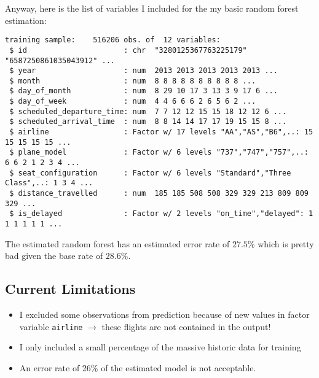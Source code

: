 \documentclass{article}\usepackage[]{graphicx}\usepackage[]{color}
\makeatletter
\newenvironment{kframe}{%
 \def\at@end@of@kframe{}%
 \ifinner\ifhmode%
  \def\at@end@of@kframe{\end{minipage}}%
  \begin{minipage}{\columnwidth}%
 \fi\fi%
 \def\FrameCommand##1{\hskip\@totalleftmargin \hskip-\fboxsep
 \colorbox{shadecolor}{##1}\hskip-\fboxsep
     \hskip-\linewidth \hskip-\@totalleftmargin \hskip\columnwidth}%
 \MakeFramed {\advance\hsize-\width
   \@totalleftmargin\z@ \linewidth\hsize
   \@setminipage}}%
 {\par\unskip\endMakeFramed%
 \at@end@of@kframe}
\newenvironment{knitrout}{}{} %
\makeatother
\begin{document}
Anyway, here is the list of variables I included for the my basic random forest estimation:

\begin{knitrout}
\color{fgcolor}\begin{kframe}
\begin{verbatim}
training sample:	516206 obs. of  12 variables:
 $ id                      : chr  "3280125367763225179" "6587250861035043912" ...
 $ year                    : num  2013 2013 2013 2013 2013 ...
 $ month                   : num  8 8 8 8 8 8 8 8 8 8 ...
 $ day_of_month            : num  8 29 10 17 3 13 3 9 17 6 ...
 $ day_of_week             : num  4 4 6 6 6 2 6 5 6 2 ...
 $ scheduled_departure_time: num  7 7 12 12 15 15 18 12 12 6 ...
 $ scheduled_arrival_time  : num  8 8 14 14 17 17 19 15 15 8 ...
 $ airline                 : Factor w/ 17 levels "AA","AS","B6",..: 15 15 15 15 15 ...
 $ plane_model             : Factor w/ 6 levels "737","747","757",..: 6 6 2 1 2 3 4 ...
 $ seat_configuration      : Factor w/ 6 levels "Standard","Three Class",..: 1 3 4 ...
 $ distance_travelled      : num  185 185 508 508 329 329 213 809 809 329 ...
 $ is_delayed              : Factor w/ 2 levels "on_time","delayed": 1 1 1 1 1 1 ...
\end{verbatim}
\end{kframe}
\end{knitrout}

The estimated random forest has an estimated error rate of $27.5\%$ which is pretty bad given the base rate of $28.6\%$.


\subsection{Current Limitations} %
\label{sub:current_limitations}

\begin{itemize}
	\item I excluded some observations from prediction because of new values in factor variable \verb+airline+ $\rightarrow$ these flights are not contained in the output!
	\item I only included a small percentage of the massive historic data for training 
	\item An error rate of 26\% of the estimated model is not acceptable.
\end{itemize}
\end{document}
